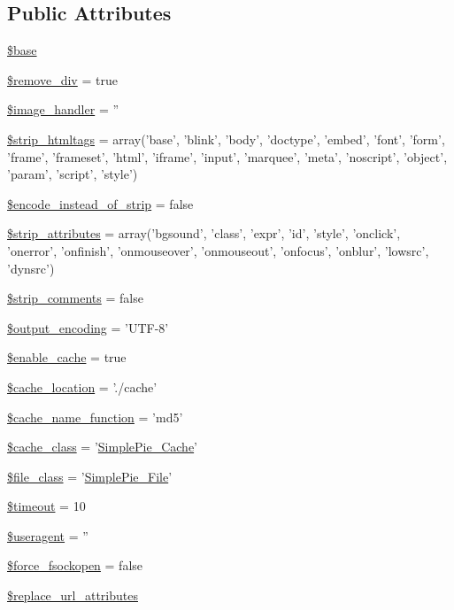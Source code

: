 \subsection*{Public Attributes}
\begin{DoxyCompactItemize}
\item 
\hyperlink{class_simple_pie___sanitize_a76a01a0e635a14b6b3749478b6d7b4bd}{\$base}
\item 
\hyperlink{class_simple_pie___sanitize_a57bb8db6a950ee03981a828364257c52}{\$remove\-\_\-div} = true
\item 
\hyperlink{class_simple_pie___sanitize_aa10fc67d8dc00a4f14b2ed6f6592df74}{\$image\-\_\-handler} = ''
\item 
\hyperlink{class_simple_pie___sanitize_a2e0616ce8550a880763b6bf34407cccd}{\$strip\-\_\-htmltags} = array('base', 'blink', 'body', 'doctype', 'embed', 'font', 'form', 'frame', 'frameset', 'html', 'iframe', 'input', 'marquee', 'meta', 'noscript', 'object', 'param', 'script', 'style')
\item 
\hyperlink{class_simple_pie___sanitize_aa1480f5e4f48e23d4d33f749dfc9b7f4}{\$encode\-\_\-instead\-\_\-of\-\_\-strip} = false
\item 
\hyperlink{class_simple_pie___sanitize_aae7867d2da9eb4e606825088dafa74c3}{\$strip\-\_\-attributes} = array('bgsound', 'class', 'expr', 'id', 'style', 'onclick', 'onerror', 'onfinish', 'onmouseover', 'onmouseout', 'onfocus', 'onblur', 'lowsrc', 'dynsrc')
\item 
\hyperlink{class_simple_pie___sanitize_a08b78049d62d7787d48a648c778d327a}{\$strip\-\_\-comments} = false
\item 
\hyperlink{class_simple_pie___sanitize_a3528b1260f911e6b5c71562e88668e66}{\$output\-\_\-encoding} = 'U\-T\-F-\/8'
\item 
\hyperlink{class_simple_pie___sanitize_afc4b6f5b055374acded84da3fb823fe8}{\$enable\-\_\-cache} = true
\item 
\hyperlink{class_simple_pie___sanitize_a86db59fda2b811cdb28fb8e032d33431}{\$cache\-\_\-location} = './cache'
\item 
\hyperlink{class_simple_pie___sanitize_a5303322abff16ce8a4cd3950aa470b83}{\$cache\-\_\-name\-\_\-function} = 'md5'
\item 
\hyperlink{class_simple_pie___sanitize_ac7834fd8c1dc4a81d98f0dc1589cb005}{\$cache\-\_\-class} = '\hyperlink{class_simple_pie___cache}{Simple\-Pie\-\_\-\-Cache}'
\item 
\hyperlink{class_simple_pie___sanitize_a05ef40e851c50e674265d85b7ce9d8d2}{\$file\-\_\-class} = '\hyperlink{class_simple_pie___file}{Simple\-Pie\-\_\-\-File}'
\item 
\hyperlink{class_simple_pie___sanitize_a9aba7779936d3f24347da7871755a7d2}{\$timeout} = 10
\item 
\hyperlink{class_simple_pie___sanitize_a3164462324ed85ec9bae689e3d85e5d3}{\$useragent} = ''
\item 
\hyperlink{class_simple_pie___sanitize_a16230ad1890647318de5daed1cf3f5cb}{\$force\-\_\-fsockopen} = false
\item 
\hyperlink{class_simple_pie___sanitize_a466d5c83d6da3d7d5cdcf4aab24f3af1}{\$replace\-\_\-url\-\_\-attributes}
\end{DoxyCompactItemize}


